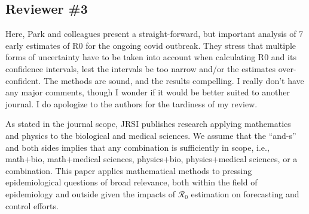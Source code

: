 \documentclass[12pt]{article}
\newcommand{\Ro}{\ensuremath{{\mathcal R}_{0}}\xspace}
\newcommand{\rev}{\subsection*}
\newcommand{\revtext}{\textsf}
\begin{document}
\rev{Reviewer \#3}

\revtext{
Here, Park and colleagues present a straight-forward, but important analysis of 7 early estimates of R0 for the ongoing covid outbreak. They stress that multiple forms of uncertainty have to be taken into account when calculating R0 and its confidence intervals, lest the intervals be too narrow and/or the estimates over-confident. The methods are sound, and the results compelling. I really don’t have any major comments, though I wonder if it would be better suited to another journal. I do apologize to the authors for the tardiness of my review.}

As stated in the journal scope, JRSI publishes research applying mathematics and physics to the biological and medical sciences. We assume that the ``and-s'' and both sides implies that any combination is sufficiently in scope, i.e., math+bio, math+medical sciences, physics+bio, physics+medical sciences, or a combination. This paper applies mathematical methods to pressing epidemiological questions of broad relevance, both within the field of epidemiology and outside given the impacts of $\Ro$ estimation on forecasting and control efforts.

\pagebreak


\end{document}
